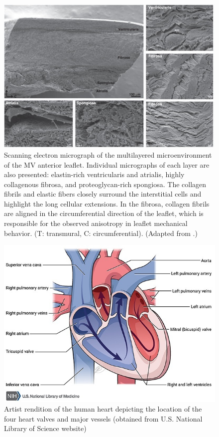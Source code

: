 \begin{figure}
\centering
\includegraphics[width=\textwidth]{Images/chapter1/valvelayers.jpg}
\caption{Scanning electron micrograph of the multilayered microenvironment of the MV anterior leaflet. Individual micrographs of each layer are also presented: elastin-rich ventricularis and atrialis, highly collagenous fibrosa, and proteoglycan-rich spongiosa. The collagen fibrils and elastic fibers closely surround the interstitial cells and highlight the long cellular extensions. In the fibrosa, collagen fibrils are aligned in the circumferential direction of the leaflet, which is responsible for the observed anisotropy in leaflet mechanical behavior. (T: transmural, C: circumferential). (Adapted from \cite{salma_heart_2016}.)}
\label{fig:valvelayers}
\end{figure}
   

\begin{figure}
\centering
\includegraphics[width=5.0in]{Images/chapter1/heartdiagram.jpeg}
\caption{Artist rendition of the human heart depicting the location of the four heart valves and major vessels (obtained from U.S. National Library of Science website)}
\label{fig:heartdiagram}
\end{figure}


